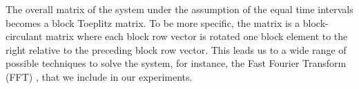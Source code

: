 The overall matrix of the system under the assumption of the equal time intervals becomes a block Toeplitz matrix. To be more specific, the matrix is a block-circulant matrix where each block row vector is rotated one block element to the right relative to the preceding block row vector. This leads us to a wide range of possible techniques to solve the system, for instance, the Fast Fourier Transform (FFT) \cite{mazancourt1983}, \cite{vescovo1997} that we include in our experiments.
